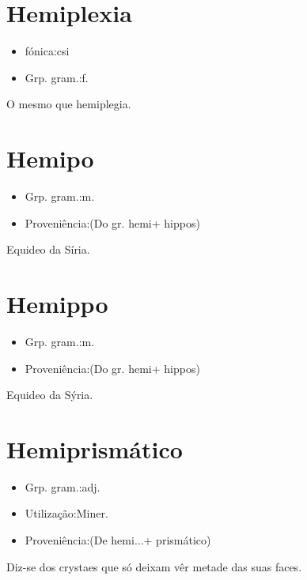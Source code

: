 \documentclass{article}
\begin{document}
\section{Hemiplexia}
\begin{itemize}
\item {fónica:csi}
\end{itemize}
\begin{itemize}
\item {Grp. gram.:f.}
\end{itemize}
O mesmo que \textunderscore hemiplegia\textunderscore .
\section{Hemipo}
\begin{itemize}
\item {Grp. gram.:m.}
\end{itemize}
\begin{itemize}
\item {Proveniência:(Do gr. \textunderscore hemi\textunderscore  + \textunderscore hippos\textunderscore )}
\end{itemize}
Equideo da Síria.
\section{Hemippo}
\begin{itemize}
\item {Grp. gram.:m.}
\end{itemize}
\begin{itemize}
\item {Proveniência:(Do gr. \textunderscore hemi\textunderscore  + \textunderscore hippos\textunderscore )}
\end{itemize}
Equideo da Sýria.
\section{Hemiprismático}
\begin{itemize}
\item {Grp. gram.:adj.}
\end{itemize}
\begin{itemize}
\item {Utilização:Miner.}
\end{itemize}
\begin{itemize}
\item {Proveniência:(De \textunderscore hemi...\textunderscore  + \textunderscore prismático\textunderscore )}
\end{itemize}
Diz-se dos crystaes que só deixam vêr metade das suas faces.
\end{document}
